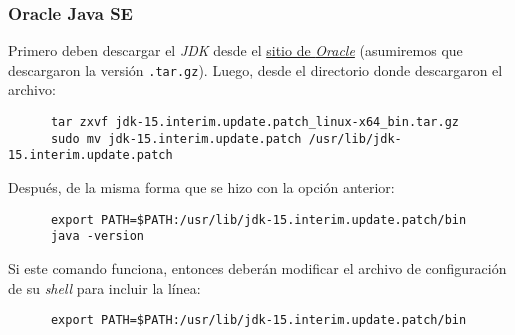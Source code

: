   \subsubsection{Oracle Java SE}
    Primero deben descargar el \textit{JDK} desde el
    \href{https://www.oracle.com/java/technologies/javase-jdk15-downloads.html}{sitio de 
    \textit{Oracle}} (asumiremos que descargaron la versión \texttt{.tar.gz}).
    Luego, desde el directorio donde descargaron el archivo:

    \begin{verbatim}
      tar zxvf jdk-15.interim.update.patch_linux-x64_bin.tar.gz
      sudo mv jdk-15.interim.update.patch /usr/lib/jdk-15.interim.update.patch
    \end{verbatim}

    Después, de la misma forma que se hizo con la opción anterior:
    
    \begin{verbatim}
      export PATH=$PATH:/usr/lib/jdk-15.interim.update.patch/bin
      java -version
    \end{verbatim}

    Si este comando funciona, entonces deberán modificar el archivo de configuración de su
    \textit{shell} para incluir la línea:

    \begin{verbatim}
      export PATH=$PATH:/usr/lib/jdk-15.interim.update.patch/bin
    \end{verbatim}